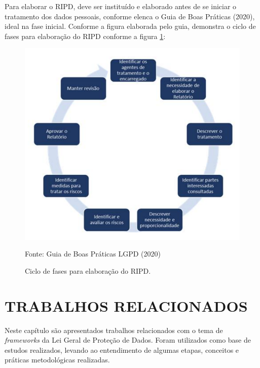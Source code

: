\documentclass[
	12pt,				%
	openright,			%
	oneside,			%
	a4paper,			%
	english,			%
	french,				%
	spanish,			%
	brazil,				%
	]{abntex2}
\begin{document}
Para elaborar o RIPD, deve ser instituído e elaborado antes de se iniciar o tratamento dos dados pessoais, conforme elenca o Guia de Boas Práticas (2020), ideal na fase inicial. Conforme a figura elaborada pelo guia, demonstra o ciclo de fases para elaboração do RIPD conforme a figura \ref{fig: CicloRIPD }:
\begin{figure}[ht]
    \centering
    \caption{Ciclo de fases para elaboração do RIPD.}
    \includegraphics[width=5.5in]{Images/07CicloRIPD.png}
    \label{fig: CicloRIPD }
    
    \centering \small Fonte: Guia de Boas Práticas LGPD (2020)
\end{figure}



\chapter{TRABALHOS RELACIONADOS}
\label{ch: trabalhos relacionados}

Neste capítulo são apresentados trabalhos relacionados com o tema de \textit{frameworks} da Lei Geral de Proteção de Dados. Foram utilizados como base de estudos realizados, levando ao entendimento de algumas etapas, conceitos e práticas metodológicas realizadas.
\end{document}

